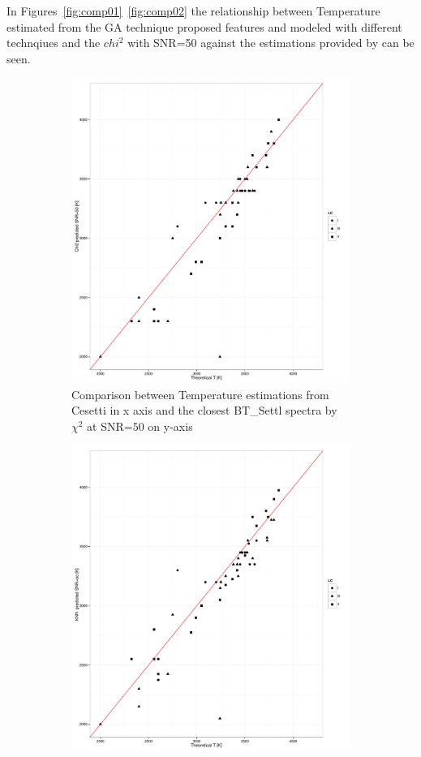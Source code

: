 In Figures~\ref{fig:comp01}~\ref{fig:comp02} the relationship between Temperature
estimated from the GA technique proposed features and modeled with different 
technqiues and the $chi^2$ with SNR=50 against the 
estimations provided by \cite{cesetti} can be seen.

\begin {figure}
 \centering
 \begin{subfigure}{.85\textwidth}
  \centering
  \includegraphics[width=11cm]{figs/irtf_T_chi250_Cesetti.pdf}
  \caption{Comparison between Temperature estimations from Cesetti 
  in x axis and the closest BT\_Settl spectra by $\chi^2$ at SNR=$50$ on y-axis}
 \label{fig:chi2_50_spt}
 \end{subfigure}
  \begin{subfigure}{.85\textwidth}
  \centering
  \includegraphics[width=11cm]{figs/irtf_T_knnoo_Cesetti.pdf}

\end{subfigure}
\end{figure}
